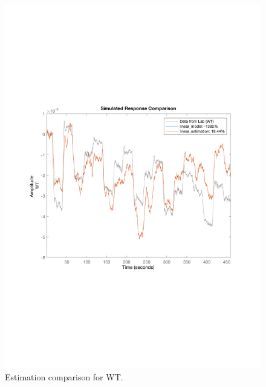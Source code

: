 \begin{figure}[H]
 \centering
\includegraphics[scale=0.45]{report/pictures/WT_estimation.pdf}
    \caption{Estimation comparison for WT.}
\end{figure}
